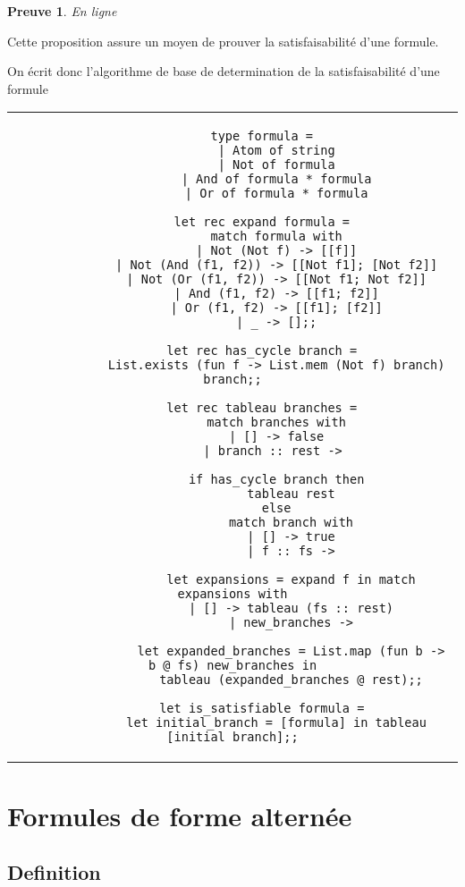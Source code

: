 \documentclass{paper}
\newtheorem{preuve}{Preuve}
\begin{document}
\begin{preuve}
    En ligne
\end{preuve}
Cette proposition assure un moyen de prouver la satisfaisabilité d'une formule.

On écrit donc l'algorithme de base de determination de la satisfaisabilité d'une formule 

\begin{tabular}{c}
    \begin{lstlisting}
        type formula =
            | Atom of string
            | Not of formula
            | And of formula * formula
            | Or of formula * formula

        let rec expand formula =
            match formula with
            | Not (Not f) -> [[f]]
            | Not (And (f1, f2)) -> [[Not f1]; [Not f2]]
            | Not (Or (f1, f2)) -> [[Not f1; Not f2]]
            | And (f1, f2) -> [[f1; f2]]
            | Or (f1, f2) -> [[f1]; [f2]]
            | _ -> [];;

        let rec has_cycle branch =
            List.exists (fun f -> List.mem (Not f) branch) branch;;

        let rec tableau branches =
            match branches with
            | [] -> false
            | branch :: rest -> 

            if has_cycle branch then
                tableau rest
            else
                match branch with
                | [] -> true
                | f :: fs ->

                let expansions = expand f in match expansions with
                | [] -> tableau (fs :: rest)
                | new_branches ->
                
                let expanded_branches = List.map (fun b -> b @ fs) new_branches in
                tableau (expanded_branches @ rest);;

        let is_satisfiable formula =
            let initial_branch = [formula] in tableau [initial_branch];;
    \end{lstlisting}
\end{tabular}


\section{Formules de forme alternée}



\subsection{Definition}
\end{document}
